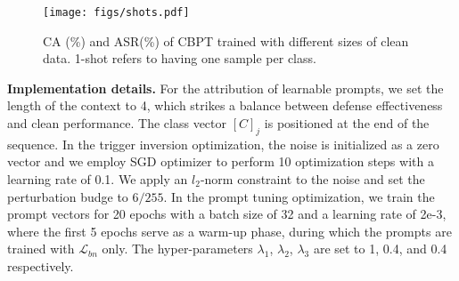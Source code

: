 

\begin{figure}[t]
\begin{center}
\texttt{[image: figs/shots.pdf]}
\end{center}
\caption{CA (\%) and ASR(\%) of CBPT trained with different sizes of clean data. 1-shot refers to having one sample per class.}
\label{fig:shots}
\end{figure}


\textbf{Implementation details.}
For the attribution of learnable prompts, we set the length of the context to 4, which strikes a balance between defense effectiveness and clean performance. The class vector $[C]_j$ is positioned at the end of the sequence. In the trigger inversion optimization, the noise is initialized as a zero vector and we employ SGD optimizer to perform 10 optimization steps with a learning rate of 0.1. We apply an $l_2$-norm constraint to the noise and set the perturbation budge to $6/255$. In the prompt tuning optimization, we train the prompt vectors for 20 epochs with a batch size of 32 and a learning rate of 2e-3, where the first 5 epochs serve as a warm-up phase, during which the prompts are trained with $\mathcal{L}_{bn}$ only. The hyper-parameters $\lambda_1$, $\lambda_2$, $\lambda_3$ are set to 1, 0.4, and 0.4 respectively.

